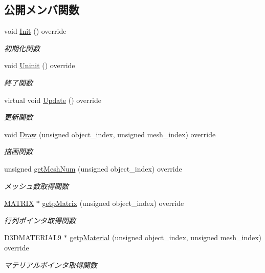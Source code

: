 \subsection*{公開メンバ関数}
\begin{DoxyCompactItemize}
\item 
void \mbox{\hyperlink{class_goal_draw_a3eb0a555fa2db9d2c1253018ea65796e}{Init}} () override
\begin{DoxyCompactList}\small\item\em 初期化関数 \end{DoxyCompactList}\item 
void \mbox{\hyperlink{class_goal_draw_a01318a0606848a3ca8ca7b7acbf4df24}{Uninit}} () override
\begin{DoxyCompactList}\small\item\em 終了関数 \end{DoxyCompactList}\item 
virtual void \mbox{\hyperlink{class_goal_draw_a6e003277ed44eb9c800a616b6acbcb20}{Update}} () override
\begin{DoxyCompactList}\small\item\em 更新関数 \end{DoxyCompactList}\item 
void \mbox{\hyperlink{class_goal_draw_a554c826d7a4534ee489dfe18edf7ee0e}{Draw}} (unsigned object\+\_\+index, unsigned mesh\+\_\+index) override
\begin{DoxyCompactList}\small\item\em 描画関数 \end{DoxyCompactList}\item 
unsigned \mbox{\hyperlink{class_goal_draw_ac80c8da78cda7b15a4ce46f7d7057622}{get\+Mesh\+Num}} (unsigned object\+\_\+index) override
\begin{DoxyCompactList}\small\item\em メッシュ数取得関数 \end{DoxyCompactList}\item 
\mbox{\hyperlink{_vector3_d_8h_a032295cd9fb1b711757c90667278e744}{M\+A\+T\+R\+IX}} $\ast$ \mbox{\hyperlink{class_goal_draw_a536a23c043576f9032e6651d7644d038}{getp\+Matrix}} (unsigned object\+\_\+index) override
\begin{DoxyCompactList}\small\item\em 行列ポインタ取得関数 \end{DoxyCompactList}\item 
D3\+D\+M\+A\+T\+E\+R\+I\+A\+L9 $\ast$ \mbox{\hyperlink{class_goal_draw_ae7f45a84006809475aba8d9ce1b1f8a5}{getp\+Material}} (unsigned object\+\_\+index, unsigned mesh\+\_\+index) override
\begin{DoxyCompactList}\small\item\em マテリアルポインタ取得関数 \end{DoxyCompactList}\end{DoxyCompactItemize}
